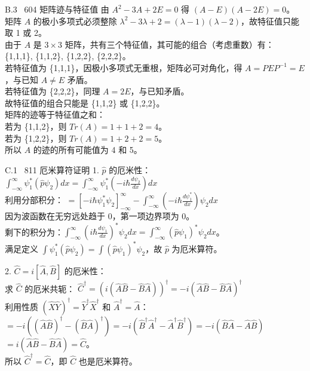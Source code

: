 \documentclass[a4paper,11pt]{article}
\begin{document}
\begin{solution}{B.3 \textbar\ 604 矩阵迹与特征值}
由 $A^2 - 3A + 2E = 0$ 得 $(A-E)(A-2E)=0$。\\
矩阵 $A$ 的极小多项式必须整除 $\lambda^2 - 3\lambda + 2 = (\lambda-1)(\lambda-2)$，故特征值只能取 1 或 2。\\
由于 $A$ 是 $3 \times 3$ 矩阵，共有三个特征值，其可能的组合（考虑重数）有：\\
\{1,1,1\}, \{1,1,2\}, \{1,2,2\}, \{2,2,2\}。\\
若特征值为 \{1,1,1\}，因极小多项式无重根，矩阵必可对角化，得 $A = P E P^{-1} = E$，与已知 $A \neq E$ 矛盾。\\
若特征值为 \{2,2,2\}，同理 $A = 2E$，与已知矛盾。\\
故特征值的组合只能是 \{1,1,2\} 或 \{1,2,2\}。\\
矩阵的迹等于特征值之和：\\
若为 \{1,1,2\}，则 $Tr(A) = 1+1+2 = 4$。\\
若为 \{1,2,2\}，则 $Tr(A) = 1+2+2 = 5$。\\
所以 $A$ 的迹的所有可能值为 4 和 5。
\end{solution}

\begin{solution}{C.1 \textbar\ 811 厄米算符证明}
1. $\hat{p}$ 的厄米性：\\
$\int_{-\infty}^{\infty} \psi_1^* (\hat{p} \psi_2) dx = \int_{-\infty}^{\infty} \psi_1^* \left(-i\hbar \frac{d\psi_2}{dx}\right) dx$\\
利用分部积分：
$= \left[-i\hbar \psi_1^* \psi_2 \right]_{-\infty}^{\infty} - \int_{-\infty}^{\infty} \left(-i\hbar \frac{d\psi_1^*}{dx}\right) \psi_2 dx$\\
因为波函数在无穷远处趋于 0，第一项边界项为 0。\\
剩下的积分为：$\int_{-\infty}^{\infty} \left(i\hbar \frac{d\psi_1}{dx}\right)^* \psi_2 dx = \int_{-\infty}^{\infty} (\hat{p} \psi_1)^* \psi_2 dx$。\\
满足定义 $\int \psi_1^* (\hat{p} \psi_2) = \int (\hat{p} \psi_1)^* \psi_2$，故 $\hat{p}$ 为厄米算符。

2. $\hat{C} = i[\hat{A}, \hat{B}]$ 的厄米性：\\
求 $\hat{C}$ 的厄米共轭：
$\hat{C}^\dagger = \left( i(\hat{A}\hat{B} - \hat{B}\hat{A}) \right)^\dagger = -i (\hat{A}\hat{B} - \hat{B}\hat{A})^\dagger$\\
利用性质 $(\hat{X}\hat{Y})^\dagger = \hat{Y}^\dagger \hat{X}^\dagger$ 和 $\hat{A}^\dagger = \hat{A}$：\\
$= -i ( (\hat{A}\hat{B})^\dagger - (\hat{B}\hat{A})^\dagger ) = -i ( \hat{B}^\dagger \hat{A}^\dagger - \hat{A}^\dagger \hat{B}^\dagger ) = -i (\hat{B}\hat{A} - \hat{A}\hat{B})$\\
$= i(\hat{A}\hat{B} - \hat{B}\hat{A}) = \hat{C}$。\\
所以 $\hat{C}^\dagger = \hat{C}$，即 $\hat{C}$ 也是厄米算符。
\end{solution}
\end{document}
